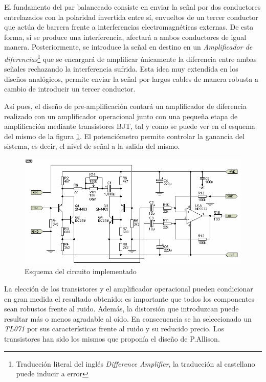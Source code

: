 El fundamento del par balanceado consiste en enviar la señal por dos conductores entrelazados con la polaridad invertida entre sí, envueltos de un tercer conductor que actúa de barrera frente a interferencias electromagnéticas externas. De esta forma, si se produce una interferencia, afectará a ambos conductores de igual manera. Posteriormente, se introduce la señal en destino en un \emph{Amplificador de diferencias}\footnote{Traducción literal del inglés \emph{Difference Amplifier}, la traducción al castellano puede inducir a error} que se encargará de amplificar únicamente la diferencia entre ambas señales rechazando la interferencia sufrida. Esta idea muy extendida en los diseños analógicos, permite enviar la señal por largos cables de manera robusta a cambio de introducir un tercer conductor. 

Así pues, el diseño de pre-amplificación contará un amplificador de diferencia realizado con un amplificador operacional junto con una pequeña etapa de amplificación mediante transistores BJT, tal y como se puede ver en el esquema del mismo de la figura \ref{fig:circuit}. El potenciómetro permite controlar la ganancia del sistema, es decir, el nivel de señal a la salida del mismo.

\begin{figure}[!thb]
\begin{center}
\includegraphics[width=13cm]{img/circuito.png}
\caption{\label{fig:circuit}Esquema del circuito implementado}
\end{center}
\end{figure}

La elección de los transistores y el amplificador operacional pueden condicionar en gran medida el resultado obtenido: es importante que todos los componentes sean robustos frente al ruido. Además, la distorsión que introduzcan puede resultar más o menos agradable al oído. En consecuencia se ha seleccionado un \emph{TL071} \cite{opampdata} por sus características frente al ruido y su reducido precio. Los transistores han sido los mismos que proponía el diseño de P.Allison.


